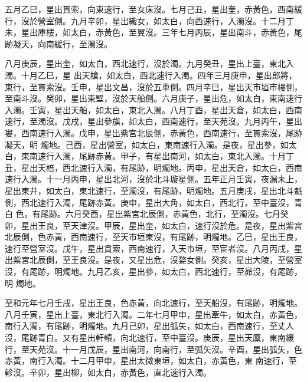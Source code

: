 \begin{pinyinscope}
 五月乙巳，星出貫索，向東速行，至女床沒。七月己丑，星出奎，赤黃色，西南緩行，沒於營室側。九月辛卯，星出織女，如太白，向西速行，入濁沒。十二月丁未，星出庫樓，如太白，赤黃色，至翼沒。三年七月丙辰，星出南斗，赤黃色，尾跡凝天，向南緩行，至濁沒。



 八月庚辰，星出奎，如太白，西北速行，沒於濁。九月癸丑，星出上臺，東北入濁。十月乙巳，星
 出天槍，如太白，西北速行入濁。四年三月庚申，星出郎將，東行，至貫索沒。壬申，星出文昌，沒於五車側。四月辛巳，星出天市垣市樓側，至南斗沒。癸卯，星出東壁，沒於天船側。六月庚子，星出危，如太白，東南速行入濁。壬寅，星出天船，如太白，東北入濁。八月丁酉，星出天倉，如太白，西南速行，至濁沒。戊戌，星出參旗，如太白，西南速行，至天苑沒。九月丙午，星出婁，西南速行入濁。戊申，星出紫宮北辰側，赤黃色，西南速行，至貫索沒，尾跡凝天，明
 燭地。己酉，星出營室，如太白，東南速行入濁。是夜，星出參，如太白，東南速行入濁，尾跡赤黃。甲子，有星出南河，如太白，東北入濁。十月丁丑，星出天棓，西北速行入濁，有尾跡，明燭地。丙申，星出天倉，如太白，西南速行入濁。十一月丙申，星出北河，沒於北斗璇星側。五年正月壬寅，夜漏未上，星出東井，如太白，東北速行，至濁沒，有尾跡，明燭地。五月庚戌，星出北斗魁側，西北速行入濁，尾跡赤黃。庚申，星出大角，如太白，西北行，至中臺沒，青白
 色，有尾跡。六月癸酉，星出紫宮北辰側，赤黃色，北行，至濁沒。七月癸卯，星出王良，至天津沒。甲辰，星出奎，如太白，速行沒於危。是夜，星出紫宮北辰側，色赤黃，西南速行，至天市垣東沒，有尾跡，明燭地。乙巳，星出王良，速行至營室沒。戊午，星出貫索，西南速行，入天市垣，至宦者沒。八月丙戌，星出紫宮北辰側，至王良沒。是夜，又星出危，沒婺女側。癸亥，星出大陵，至營室沒，有尾跡，明燭地。九月乙亥，星出參，如太白，西北速行，至昴沒，有尾跡，明
 燭地。



 至和元年七月壬戌，星出王良，色赤黃，向北速行，至天船沒，有尾跡，明燭地。八月壬寅，星出上臺，東北行入濁。二年七月甲申，星出牽牛，如太白，赤黃色，南行入濁，有尾跡，明燭地。九月己卯，星出弧矢，如太白，西南速行，至丈人沒，尾跡青白。又有星出軒轅，向北速行，至中臺沒。庚辰，星出天廩，東南緩行，至天苑沒。十一月戊辰，星出南河，向南行，至弧矢沒。辛酉，星出弧矢，色赤黃，南行入濁。十二月甲申，星出太微東垣，如太白，赤黃色，東
 南速行，至軫沒。辛卯，星出柳，如太白，赤黃色，直北速行入濁。




\end{pinyinscope}
